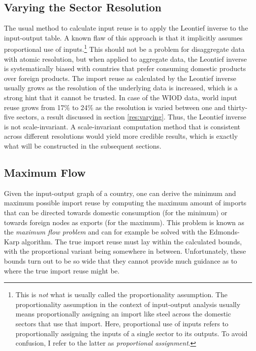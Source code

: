 \documentclass[english]{uzhpub}
\begin{document}
\subsection{Varying the Sector Resolution}
\label{Varying}
The usual method to calculate input reuse is to apply the Leontief inverse to the input-output table. A known flaw of this approach is that it implicitly assumes proportional use of inputs.\footnote{This is \emph{not} what is usually called the proportionality assumption. The proportionality assumption in the context of input-output analysis usually means proportionally assigning an import like steel across the domestic sectors that use that import. Here, proportional use of inputs refers to proportionally assigning the inputs of a single sector to its outputs. To avoid confusion, I refer to the latter as \emph{proportional assignment}.} This should not be a problem for disaggregate data with atomic resolution, but when applied to aggregate data, the Leontief inverse is systematically biased with countries that prefer consuming domestic products over foreign products. The import reuse as calculated by the Leontief inverse usually grows as the resolution of the underlying data is increased, which is a strong hint that it cannot be trusted. In case of the WIOD data, world input reuse grows from 17\% to 24\% as the resolution is varied between one and thirty-five sectors, a result discussed in section \ref{res:varying}. Thus, the Leontief inverse is not scale-invariant. A scale-invariant computation method that is consistent across different resolutions would yield more credible results, which is exactly what will be constructed in the subsequent sections.

\subsection{Maximum Flow}
Given the input-output graph of a country, one can derive the minimum and maximum possible import reuse by computing the maximum amount of imports that can be directed towards domestic consumption (for the minimum) or towards foreign nodes as exports (for the maximum). This problem is known as the \emph{maximum flow problem} and can for example be solved with the Edmonds-Karp algorithm. \cite{edmonds1972theoretical} The true import reuse must lay within the calculated bounds, with the proportional variant being somewhere in between. Unfortunately, these bounds turn out to be so wide that they cannot provide much guidance as to where the true import reuse might be.
\end{document}
